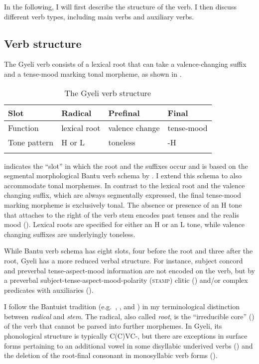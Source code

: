 In the following, I will first describe the structure of the verb.  I then discuss different verb types, including main verbs and auxiliary verbs. 




\subsection{Verb structure}
\label{sec:StructVerb}

The Gyeli verb consists of a lexical root that can take a valence-changing suffix and a tense-mood marking tonal morpheme, as shown in . 


\begin{table}
\begin{tabular}{llll}
 \lsptoprule
Slot &   Radical & Prefinal &  Final \\
\midrule
Function &  lexical root & valence change & tense-mood \\
Tone pattern  & H or L & toneless & -H \\
   \lspbottomrule
\end{tabular}
\caption{The Gyeli verb structure\label{Tab:Gyeliverb}}
\end{table}


 indicates the ``slot'' in which the root and the suffixes occur and is based on the segmental morphological Bantu verb schema by \citet[184]{gueldemann2003}. I extend this schema to also accommodate tonal morphemes. In contrast to the lexical root and the valence changing suffix, which are always segmentally expressed, the final tense-mood marking morpheme is exclusively tonal. The absence or presence of an H tone that attaches to the right of the verb stem encodes past tenses and the realis mood (). Lexical roots are specified for either an H or an L tone, while valence changing suffixes are underlyingly toneless. 

While  Bantu verb schema has eight slots, four before the root and three after the root, Gyeli has a more reduced verbal structure. For instance, subject concord and preverbal tense-aspect-mood information are not encoded on the verb, but by a preverbal subject-tense-aspect-mood-polarity (\textsc{stamp}) clitic () and/or complex predicates with auxiliaries ().

I follow the Bantuist tradition (e.g.\ \citealt{guthrie71}, \citealt{hyman93}, and  \citealt{schadeberg2003}) in my terminological distinction between  {\itshape radical} and {\itshape stem}. The radical, also called {\itshape root}, is the ``irreducible core'' (\citealt[14]{guthrie71}) of the verb that cannot be parsed into further morphemes. In Gyeli, its phonological structure is typically C(C)VC-, but there are exceptions in surface forms pertaining to an additional vowel in some disyllabic underived verbs () and the deletion of the root-final consonant in monosyllabic verb forms (). 


